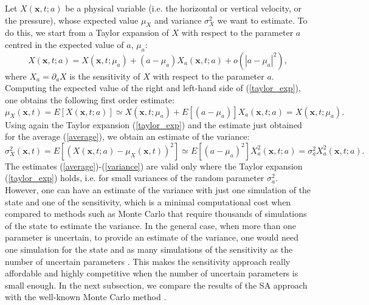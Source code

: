 Let $X(\mathbf{x},t;a)$ be a physical variable (i.e. the horizontal or vertical velocity, or the pressure), whose expected value $\mu_X$ and variance $\sigma_X^2$ we want to estimate. To do this, we start from a Taylor expansion of $X$ with respect to the parameter  $a$ centred in the expected value of $a$, $\mu_a$:
\begin{equation}
X(\mathbf{x},t;a) = X(\mathbf{x},t;\mu_a) + (a-\mu_a)X_a(\mathbf{x},t;a) + o(|a-\mu_a|^2),
\label{taylor_exp}
\end{equation}
where $X_a = \partial_a X$ is the sensitivity of $X$ with respect to the parameter $a$. Computing the expected value of the right and left-hand side of (\ref{taylor_exp}), one obtains the following first order estimate:
\begin{equation}
\mu_X(\mathbf{x},t) = E[X(\mathbf{x},t;a)] \simeq X(\mathbf{x},t;\mu_a) + E[(a-\mu_a)]X_a(\mathbf{x},t;a) = X(\mathbf{x},t;\mu_a).
\label{average}
\end{equation}
Using again the Taylor expansion (\ref{taylor_exp}) and the estimate just obtained for the average (\ref{average}), we obtain an estimate of the variance:
\begin{equation}
\sigma_X^2(\mathbf{x},t) = E[(X(\mathbf{x},t;a)-\mu_X(\mathbf{x},t))^2] \simeq E[(a-\mu_a)^2]X_a^2(\mathbf{x},t;a) = \sigma_a^2 X_a^2(\mathbf{x},t;a).
\label{variance}
\end{equation}
The estimates (\ref{average})-(\ref{variance}) are valid only where the Taylor expansion (\ref{taylor_exp}) holds, i.e. for small variances of the random parameter $\sigma_a^2$. However, one can have an estimate of the variance with just one simulation of the state and one of the sensitivity, which is a minimal computational cost when compared to methods such as Monte Carlo that require thousands of simulations of the state to estimate the variance. In the general case, when more than one parameter is uncertain, to provide an estimate of the variance, one would need one simulation for the state and as many simulations of the sensitivity as the number of uncertain parameters \cite{fiorini2018phd}. This makes the sensitivity approach really affordable and highly competitive when the number of uncertain parameters is small enough. In the next subsection, we compare the results of the SA approach with the well-known Monte Carlo method \cite{christian1999monte}.

